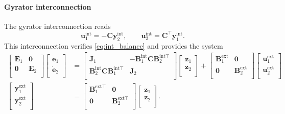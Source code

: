 \paragraph{Gyrator interconnection}
The gyrator interconnection reads
\begin{equation*}
\mathbf{u}_1^{\text{int}} = -\mathbf{C} \mathbf{y}_2^{\text{int}}, \qquad
\mathbf{u}_2^{\text{int}} = \mathbf{C}^\top \mathbf{y}_1^{\text{int}}.
\end{equation*}
This interconnection verifies \eqref{eq:int_balance} and provides the system
\begin{align*}
\begin{bmatrix}
\mathbf{E}_1 & \mathbf{0} \\ \mathbf{0} & \mathbf{E}_2 \\
\end{bmatrix}
\begin{bmatrix}
\dot{\mathbf{e}}_1 \\ \dot{\mathbf{e}}_2 \\
\end{bmatrix} &= 
\begin{bmatrix}
\mathbf{J}_1 & -\mathbf{B}_1^{\text{int}} \mathbf{C} \mathbf{B}_2^{\text{int} \top} \\ 
\mathbf{B}_2^{\text{int}} \mathbf{C} \mathbf{B}_1^{\text{int} \top}  & \mathbf{J}_2 \\
\end{bmatrix}
\begin{bmatrix}
\mathbf{z}_1 \\ 
\mathbf{z}_2 \\
\end{bmatrix}+ 
\begin{bmatrix}
\mathbf{B}_1^{\text{ext}} & \mathbf{0} \\ \mathbf{0} & \mathbf{B}_2^{\text{ext}} \\
\end{bmatrix} 
\begin{bmatrix}
\mathbf{u}_1^{\text{ext}} \\ \mathbf{u}_2^{\text{ext}} \\
\end{bmatrix}  \\
\begin{bmatrix}
\mathbf{y}_1^{\text{ext}} \\ \mathbf{y}_2^{\text{ext}} \\
\end{bmatrix}  &= \begin{bmatrix}
\mathbf{B}_1^{\text{ext} \top} & \mathbf{0} \\
\mathbf{0} & \mathbf{B}_2^{\text{ext} \top} \\
\end{bmatrix} \begin{bmatrix}
\mathbf{z}_1 \\ 
\mathbf{z}_2 \\
\end{bmatrix}.
\end{align*}

